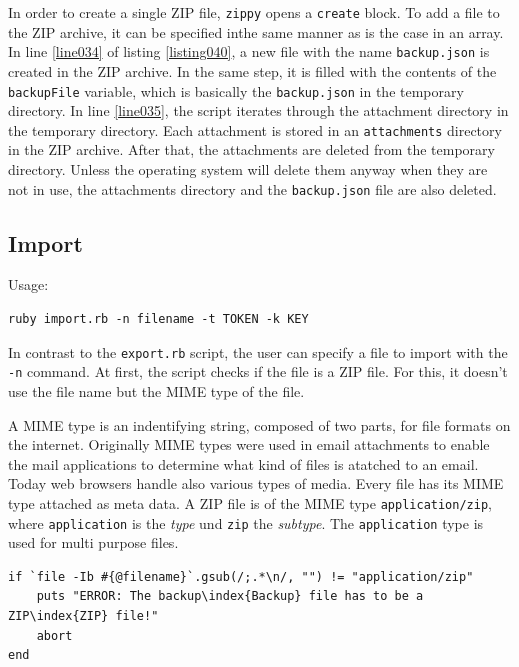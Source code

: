 In order to create a single ZIP file, \texttt{zippy} opens a \lstinline{create} block. To add a file to the ZIP archive, it can be specified inthe same manner as is the case in an array. In  line \ref{line034} of listing \ref{listing040}, a new file with the name \texttt{backup.json} is created in the ZIP archive. In the same step, it is filled with the contents of the \lstinline{backupFile} variable, which is basically the \texttt{backup.json} in the temporary directory. In line \ref{line035}, the script iterates through the attachment directory in the temporary directory. Each attachment is stored in an \texttt{attachments} directory in the ZIP archive. After that, the attachments are deleted from the temporary directory. Unless the operating system will delete them anyway when they are not in use, the attachments directory and the \texttt{backup.json} file are also deleted.




\subsection{Import}

Usage:
\begin{lstlisting}[aboveskip=1\baselineskip, style=bash, caption=\texttt{import.rb} usage., label=listing041]
ruby import.rb -n filename -t TOKEN -k KEY
\end{lstlisting}

In contrast to the \texttt{export.rb} script, the user can specify a file to import with the \texttt{-n} command. At first, the script checks if the file is a ZIP file. For this, it doesn't use the file name but the MIME type of the file.

A MIME type is an indentifying string, composed of two parts, for file formats on the internet. Originally MIME types were used in email attachments to enable the  mail applications to determine what kind of files is atatched to an email. Today web browsers handle also various types of media. Every file has its MIME type attached as meta data. A ZIP file is of the MIME type \texttt{application/zip}, where \texttt{application} is the \emph{type} und \texttt{zip} the \emph{subtype}. The \texttt{application} type is used for multi purpose files.

\begin{lstlisting}[aboveskip=1\baselineskip, caption=Checking if the file has the MIME type \textquotedblleft application/zip\textquotedblright, label=listing008]
if `file -Ib #{@filename}`.gsub(/;.*\n/, "") != "application/zip"
	puts "ERROR: The backup\index{Backup} file has to be a ZIP\index{ZIP} file!"
	abort
end
\end{lstlisting}
	
